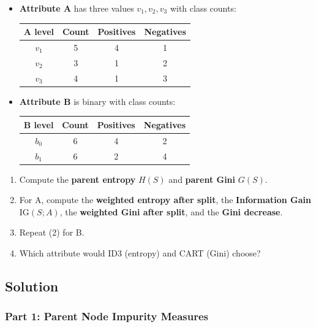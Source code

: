\documentclass[12pt]{article}
\begin{document}
\begin{itemize}
\item \textbf{Attribute A} has three values $v_{1},v_{2},v_{3}$ with class counts:

\begin{center}
\begin{tabular}{|c|c|c|c|}
\hline
A level & Count & Positives & Negatives \\
\hline
$v_{1}$ & 5 & 4 & 1 \\
$v_{2}$ & 3 & 1 & 2 \\
$v_{3}$ & 4 & 1 & 3 \\
\hline
\end{tabular}
\end{center}

\item \textbf{Attribute B} is binary with class counts:

\begin{center}
\begin{tabular}{|c|c|c|c|}
\hline
B level & Count & Positives & Negatives \\
\hline
$b_{0}$ & 6 & 4 & 2 \\
$b_{1}$ & 6 & 2 & 4 \\
\hline
\end{tabular}
\end{center}
\end{itemize}

\begin{enumerate}
\item Compute the \textbf{parent entropy} $H(S)$ and \textbf{parent Gini} $G(S)$.
\item For A, compute the \textbf{weighted entropy after split}, the \textbf{Information Gain} $\text{IG}(S;A)$, the \textbf{weighted Gini after split}, and the \textbf{Gini decrease}.
\item Repeat (2) for B.
\item Which attribute would ID3 (entropy) and CART (Gini) choose?
\end{enumerate}

\subsection{Solution}

\subsubsection{Part 1: Parent Node Impurity Measures}
\end{document}
